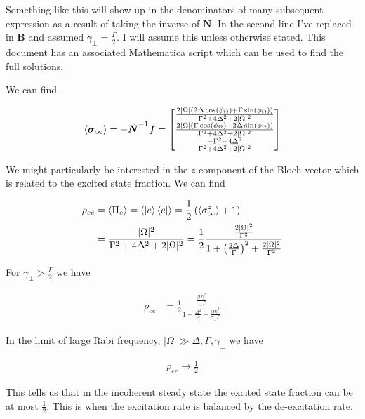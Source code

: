 \documentclass[12pt]{article}
\newcommand{\bv}[1]{\boldsymbol{#1}}
\begin{document}
Something like this will show up in the denominators of many subsequent expression as a result of taking the inverse of $\tilde{\bv{N}}$. In the second line I've replaced in $\bv{B}$ and assumed $\gamma_{\perp} = \frac{\Gamma}{2}$. I will assume this unless otherwise stated. This document has an associated Mathematica script which can be used to find the full solutions.

We can find

\begin{align}
\Braket{\bv{\sigma}_{\infty}} = -\bv{\tilde{N}}^{-1}\bv{f} = 
\begin{bmatrix}
\frac{2|\Omega|(2\Delta \cos(\phi_{\Omega})+\Gamma \sin(\phi_{\Omega}))}{\Gamma^2 + 4\Delta^2 + 2|\Omega|^2}\\
\frac{2|\Omega|(\Gamma \cos(\phi_{\Omega})-2\Delta \sin(\phi_{\Omega}))}{\Gamma^2 + 4\Delta^2 + 2|\Omega|^2}\\
\frac{-\Gamma^2-4\Delta^2}{\Gamma^2 + 4\Delta^2 + 2|\Omega|^2}\\
\end{bmatrix}
\end{align}

We might particularly be interested in the $z$ component of the Bloch vector which is related to the excited state fraction. We can find

\begin{align}
\rho_{ee} &= \Braket{\Pi_e} = \langle\ket{e}\bra{e} \rangle = \frac{1}{2}\left(\Braket{\sigma^z_{\infty}} + 1 \right)\\
&= \frac{|\Omega|^2}{\Gamma^2 + 4\Delta^2 + 2|\Omega|^2} = \frac{1}{2} \frac{\frac{2|\Omega|^2}{\Gamma^2}}{1+\left(\frac{2\Delta}{\Gamma} \right)^2 + \frac{2|\Omega|^2}{\Gamma^2}}
\end{align}

For $\gamma_{\perp}>\frac{\Gamma}{2}$ we have

\begin{align}
\rho_{ee} &= \frac{1}{2} \frac{\frac{|\Omega|^2}{\gamma_{\perp}\Gamma}}{1+\frac{\Delta^2}{\gamma_{\perp}^2} + \frac{|\Omega|^2}{\gamma_{\perp}\Gamma}}
\end{align}

In the limit of large Rabi frequency, $|\Omega|\gg\Delta,\Gamma,\gamma_{\perp}$ we have

\begin{align}
\rho_{ee} \rightarrow \frac{1}{2}
\end{align}

This tells us that in the incoherent steady state the excited state fraction can be at most $\frac{1}{2}$. This is when the excitation rate is balanced by the de-excitation rate.
\end{document}

